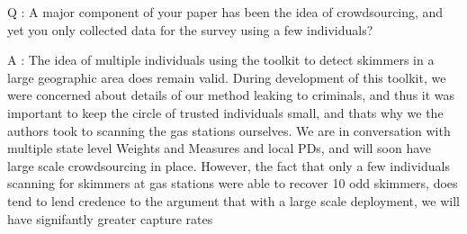 Q : A major component of your paper has been the idea of crowdsourcing, and yet you only collected data for the survey using a few individuals?

A : The idea of multiple individuals using the toolkit to detect skimmers in a large geographic area does remain valid. During development of this toolkit, we were concerned about details of our method leaking to criminals, and thus it was important to keep the circle of trusted individuals small, and thats why we the authors took to scanning the gas stations ourselves. We are in conversation with multiple state level Weights and Measures and local PDs, and will soon have large scale crowdsourcing in place. However, the fact that only a few individuals scanning for skimmers at gas stations were able to recover 10 odd skimmers, does tend to lend credence to the argument that with a large scale deployment, we will have signifantly greater capture rates

